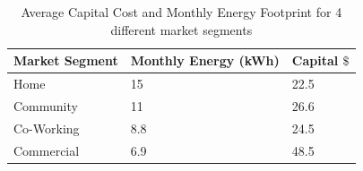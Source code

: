 \begin{table}[]
\begin{tabular}{|l|l|l|}
\hline
     Market Segment  & Monthly Energy (kWh) & Capital $\$$      \\ \hline
 Home &  15 & 22.5 \\ \hline
 Community & 11 & 26.6 \\ \hline
 Co-Working & 8.8 & 24.5 \\ \hline
 Commercial  & 6.9  & 48.5  \\ \hline
\end{tabular}
\caption{Average Capital Cost and Monthly Energy Footprint for 4 different market segments   }
\label{table:powerMatrix}
\end{table}

